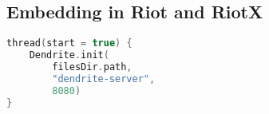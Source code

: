 \subsection{Embedding in Riot and RiotX}


\begin{lstlisting}[language=Kotlin, label={lst:riotx_init}, caption={
    A simple approach to embedding Dendrite in RiotX is simply to spawn a new thread with a call to the \texttt{Init} method as shown in listing \ref{lst:dendrite_init}
}]
thread(start = true) {
    Dendrite.init(
        filesDir.path,
        "dendrite-server", 
        8080)
}
\end{lstlisting}
